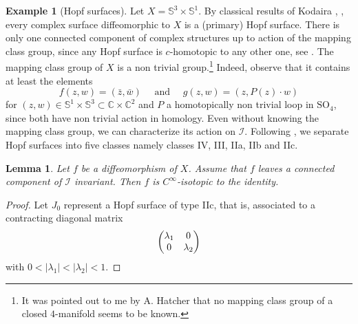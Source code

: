 \documentclass[10pt]{amsart}
\let\mathcal\mathscr
\theoremstyle{plain}
\newtheorem{lemma}[theorem]{Lemma}
\theoremstyle{definition}
\newtheorem{example}[theorem]{Example}
\theoremstyle{remark}
\numberwithin{equation}{section}
\newcommand{\CC}{{\mathbb{C}}}
\newcommand{\cI}{\mathcal{I}}
\begin{document}
\begin{example}[Hopf surfaces]
\label{Hopf}
Let $X=\mathbb S^3\times\mathbb S^1$. By classical results of Kodaira \cite{Ko}, \cite{BHPV}, every complex surface diffeomorphic to $X$ is a (primary) Hopf surface. There is only one connected component of complex structures up to action of the mapping class group, since any Hopf surface is $c$-homotopic to any other one, see \cite{We}. The mapping class group of $X$ is a non trivial group.\footnote{\label{Hatcher} It was pointed out to me by A. Hatcher that no mapping class group of a closed $4$-manifold seems to be known.} Indeed, observe that it contains at least the elements
\[
f(z,w)=(\bar z, \bar w)\quad\text{ and }\quad g(z,w)=(z, P(z)\cdot w)
\]
for $(z,w)\in\mathbb S^1\times\mathbb S^3\subset \CC\times\CC^2$ and $P$ a homotopically non trivial loop in $\text{SO}_4$, since both have non trivial action in homology. Even without knowing the mapping class group, we can characterize its action on $\cI$.
Following \cite[p.\,24]{We}, we separate Hopf surfaces into five classes namely classes IV, III, IIa, IIb and IIc.
\begin{lemma}
\label{Hopfcc}
Let $f$ be a diffeomorphism of $X$. Assume that $f$ leaves a connected component of $\cI$ invariant. Then $f$ is $C^\infty$-isotopic to the identity.
\end{lemma}

\begin{proof}
Let $J_0$ represent a Hopf surface of type IIc, that is, associated to a contracting diagonal matrix
\begin{equation}
\label{matrice}
\begin{pmatrix}
\lambda_1 &0\cr
0& \lambda_2
\end{pmatrix}
\end{equation}
with $0<\vert\lambda_1\vert<\vert\lambda_2\vert<1$.


\end{proof}
\end{example}
\end{document}
